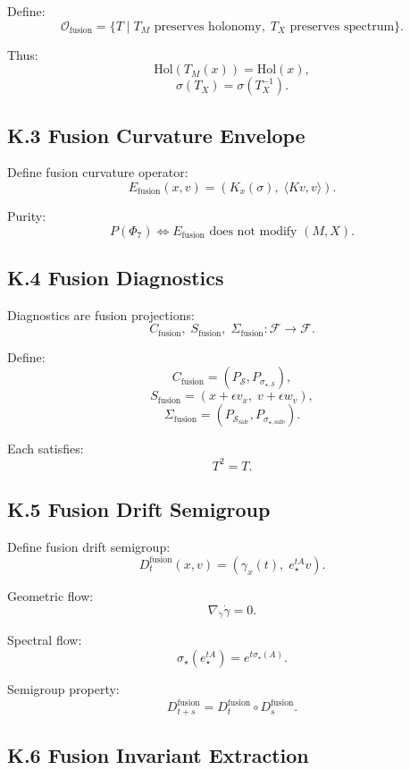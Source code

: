 Define:
\[
\mathcal{O}_{\mathrm{fusion}} =
\{ T \mid T_M \text{ preserves holonomy},\;
T_X \text{ preserves spectrum} \}.
\]

Thus:
\[
\mathrm{Hol}(T_M(x)) = \mathrm{Hol}(x),
\]
\[
\sigma(T_X) = \sigma(T_X^{-1}).
\]

\subsection*{K.3 Fusion Curvature Envelope}

Define fusion curvature operator:
\[
E_{\mathrm{fusion}}(x,v) =
(K_x(\sigma),\; \langle Kv, v \rangle).
\]

Purity:
\[
P(\Phi_7) \iff E_{\mathrm{fusion}} \text{ does not modify } (M,X).
\]

\subsection*{K.4 Fusion Diagnostics}

Diagnostics are fusion projections:
\[
C_{\mathrm{fusion}},\;
S_{\mathrm{fusion}},\;
\Sigma_{\mathrm{fusion}} : \mathcal{F} \to \mathcal{F}.
\]

Define:
\[
C_{\mathrm{fusion}} = (P_{\mathcal{S}}, P_{\sigma_{\star,\mathcal{S}}}),
\]
\[
S_{\mathrm{fusion}} = (x + \epsilon v_x,\; v + \epsilon w_v),
\]
\[
\Sigma_{\mathrm{fusion}} = (P_{\mathcal{S}_{\mathrm{safe}}}, P_{\sigma_{\star,\mathrm{safe}}}).
\]

Each satisfies:
\[
T^2 = T.
\]

\subsection*{K.5 Fusion Drift Semigroup}

Define fusion drift semigroup:
\[
D_t^{\mathrm{fusion}}(x,v) =
(\gamma_x(t),\; e_{\star}^{tA} v).
\]

Geometric flow:
\[
\nabla_{\dot{\gamma}} \dot{\gamma} = 0.
\]

Spectral flow:
\[
\sigma_{\star}(e_{\star}^{tA}) = e^{t\sigma_{\star}(A)}.
\]

Semigroup property:
\[
D_{t+s}^{\mathrm{fusion}} = D_t^{\mathrm{fusion}} \circ D_s^{\mathrm{fusion}}.
\]

\subsection*{K.6 Fusion Invariant Extraction}

